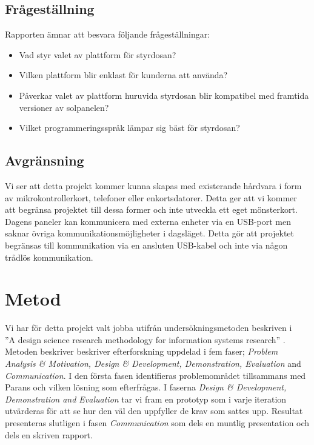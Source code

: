 \documentclass{article}
\begin{document}
		\subsection{Frågeställning} %
		\label{sub:fragestallning}
		Rapporten ämnar att besvara följande frågeställningar:\\
		\begin{itemize}
			\item Vad styr valet av plattform för styrdosan?
			\item Vilken plattform blir enklast för kunderna att använda?
			\item Påverkar valet av plattform huruvida styrdosan blir kompatibel med framtida versioner av solpanelen?
			\item Vilket programmeringsspråk lämpar sig bäst för styrdosan?
		\end{itemize}	
		


		\subsection{Avgränsning} %
		\label{sub:avgransning}
			Vi ser att detta projekt kommer kunna skapas med existerande hårdvara i form av mikrokontrollerkort, telefoner eller enkortsdatorer. Detta ger att vi kommer att begränsa projektet till dessa former och inte utveckla ett eget mönsterkort.\\

			\noindent Dagens paneler kan kommunicera med externa enheter via en USB-port men saknar övriga kommunikationsmöjligheter i dagsläget. Detta gör att projektet begränsas till kommunikation via en ansluten USB-kabel och inte via någon trådlös kommunikation.

	\section{Metod} %
	\label{sec:huvudtext}

		Vi har för detta projekt valt jobba utifrån undersökningsmetoden beskriven i \\
		''A design science research methodology for information systems research'' \citep{method}. \\

		\noindent Metoden beskriver beskriver efterforskning uppdelad i fem faser;
		\textit{Problem Analysis \& Motivation, Design \& Development, Demonstration, Evaluation} and \textit{Communication}. 
		I den första fasen identifieras problemområdet tillsammans med Parans och vilken lösning som efterfrågas. I faserna \textit{Design \& Development, Demonstration and Evaluation} tar vi fram en prototyp som i varje iteration utvärderas för att se hur den väl den uppfyller de krav som sattes upp.
		Resultat presenteras slutligen i fasen \textit{Communication} som dels en muntlig presentation och dels en skriven rapport.
\end{document}
